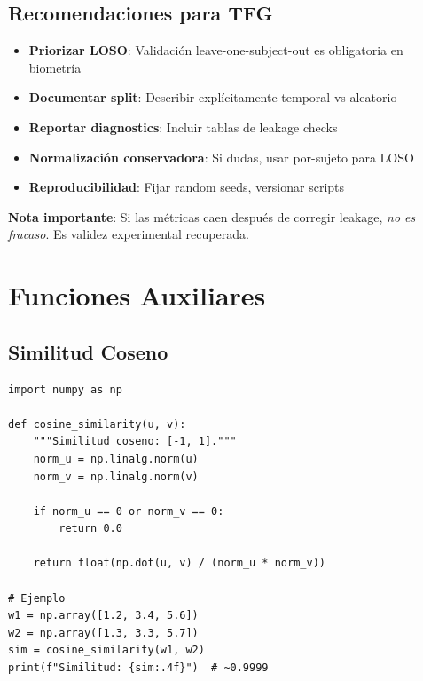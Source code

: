\documentclass[11pt,twoside,a4paper]{article}
\begin{document}
\subsection{Recomendaciones para TFG}

\begin{itemize}
    \item \textbf{Priorizar LOSO}: Validación leave-one-subject-out es obligatoria en biometría

    \item \textbf{Documentar split}: Describir explícitamente temporal vs aleatorio

    \item \textbf{Reportar diagnostics}: Incluir tablas de leakage checks

    \item \textbf{Normalización conservadora}: Si dudas, usar por-sujeto para LOSO

    \item \textbf{Reproducibilidad}: Fijar random seeds, versionar scripts
\end{itemize}

\textbf{Nota importante}: Si las métricas caen después de corregir leakage, \textit{no es fracaso}. Es validez experimental recuperada.

\newpage
\appendix

\section{Funciones Auxiliares}

\subsection{Similitud Coseno}

\begin{lstlisting}[caption=Similitud coseno]
import numpy as np

def cosine_similarity(u, v):
    """Similitud coseno: [-1, 1]."""
    norm_u = np.linalg.norm(u)
    norm_v = np.linalg.norm(v)

    if norm_u == 0 or norm_v == 0:
        return 0.0

    return float(np.dot(u, v) / (norm_u * norm_v))

# Ejemplo
w1 = np.array([1.2, 3.4, 5.6])
w2 = np.array([1.3, 3.3, 5.7])
sim = cosine_similarity(w1, w2)
print(f"Similitud: {sim:.4f}")  # ~0.9999
\end{lstlisting}
\end{document}
